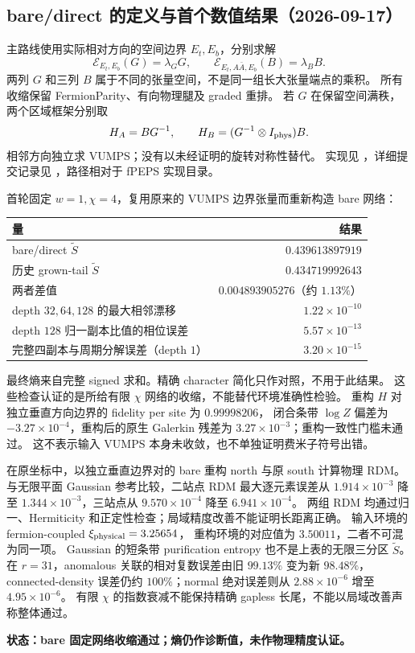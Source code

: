 \documentclass[11pt]{article}
\newcommand{\tS}{\widetilde S}
\newcommand{\status}[1]{\par\smallskip\noindent\textbf{状态：#1。}\ }
\begin{document}
\subsection{bare/direct 的定义与首个数值结果（2026-09-17）}

主路线使用实际相对方向的空间边界 $E_t,E_b$，分别求解
\begin{equation}
 \mathcal E_{E_t,E_b}(G)=\lambda_G G,\qquad
 \mathcal E_{E_t,A\bar A,E_b}(B)=\lambda_B B.
\end{equation}
两列 $G$ 和三列 $B$ 属于不同的张量空间，不是同一组长大张量端点的乘积。
所有收缩保留 FermionParity、有向物理腿及 graded 重排。
若 $G$ 在保留空间满秩，两个区域框架分别取
\begin{equation}
 H_A=BG^{-1},\qquad H_B=(G^{-1}\otimes I_{\rm phys})B.
\end{equation}
相邻方向独立求 VUMPS；没有以未经证明的旋转对称性替代。
实现见 ，详细提交记录见
，路径相对于 fPEPS 实现目录。

首轮固定 $w=1,\chi=4$，复用原来的 VUMPS 边界张量而重新构造 bare 网络：
\begin{center}
\begin{tabular}{lr}
\toprule
量 & 结果\\
\midrule
bare/direct $\tS$ & $0.439613897919$\\
历史 grown-tail $\tS$ & $0.434719992643$\\
两者差值 & $0.004893905276$（约 $1.13\%$）\\
depth $32,64,128$ 的最大相邻漂移 & $1.22\times10^{-10}$\\
depth $128$ 归一副本比值的相位误差 & $5.57\times10^{-13}$\\
完整四副本与周期分解误差（depth $1$） & $3.20\times10^{-15}$\\
\bottomrule
\end{tabular}
\end{center}
最终熵来自完整 signed 求和。精确 character 简化只作对照，不用于此结果。
这些检查认证的是所给有限 $\chi$ 网络的收缩，不能替代环境准确性检验。
重构 $H$ 对独立垂直方向边界的 fidelity per site 为 $0.99998206$，
闭合条带 $\log Z$ 偏差为 $-3.27\times10^{-4}$，重构后的原生
Galerkin 残差为 $3.27\times10^{-3}$；重构一致性门槛未通过。
这不表示输入 VUMPS 本身未收敛，也不单独证明费米子符号出错。

在原坐标中，以独立垂直边界对的 bare 重构 north 与原 south 计算物理 RDM。
与无限平面 Gaussian 参考比较，二站点 RDM 最大逐元素误差从
$1.914\times10^{-3}$ 降至 $1.344\times10^{-3}$，三站点从
$9.570\times10^{-4}$ 降至 $6.941\times10^{-4}$。
两组 RDM 均通过归一、Hermiticity 和正定性检查；局域精度改善不能证明长距离正确。
输入环境的 fermion-coupled $\xi_{\rm physical}=3.25654$，
重构环境的对应值为 $3.50011$，二者不可混为同一项。
Gaussian 的短条带 purification entropy 也不是上表的无限三分区 $\tS$。
在 $r=31$，anomalous 关联的相对复数误差由旧 $99.13\%$ 变为新 $98.48\%$，
connected-density 误差仍约 $100\%$；normal 绝对误差则从
$2.88\times10^{-6}$ 增至 $4.95\times10^{-6}$。
有限 $\chi$ 的指数衰减不能保持精确 gapless 长尾，不能以局域改善声称整体通过。
\status{bare 固定网络收缩通过；熵仍作诊断值，未作物理精度认证}
\end{document}
